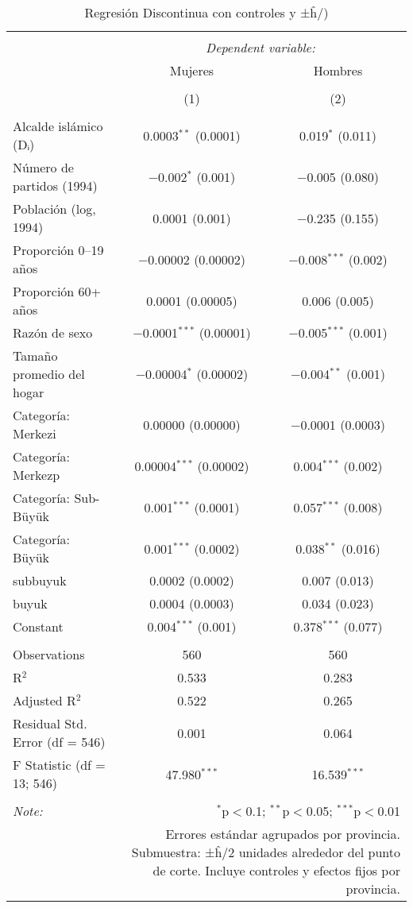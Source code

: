 
\begin{table}[ht!] \centering 
  \caption{Regresión Discontinua con controles y ±ĥ/)} 
  \label{tab:rd_submuestra_h2_mujeres_hombres} 
\begin{tabular}{@{\extracolsep{5pt}}lcc} 
\\[-1.8ex]\hline 
\hline \\[-1.8ex] 
 & \multicolumn{2}{c}{\textit{Dependent variable:}} \\ 
\cline{2-3} 
 & Mujeres & Hombres \\ 
\\[-1.8ex] & (1) & (2)\\ 
\hline \\[-1.8ex] 
 Alcalde islámico (Dᵢ) & 0.0003$^{**}$ (0.0001) & 0.019$^{*}$ (0.011) \\ 
  Número de partidos (1994) & $-$0.002$^{*}$ (0.001) & $-$0.005 (0.080) \\ 
  Población (log, 1994) & 0.0001 (0.001) & $-$0.235 (0.155) \\ 
  Proporción 0–19 años & $-$0.00002 (0.00002) & $-$0.008$^{***}$ (0.002) \\ 
  Proporción 60+ años & 0.0001 (0.00005) & 0.006 (0.005) \\ 
  Razón de sexo & $-$0.0001$^{***}$ (0.00001) & $-$0.005$^{***}$ (0.001) \\ 
  Tamaño promedio del hogar & $-$0.00004$^{*}$ (0.00002) & $-$0.004$^{**}$ (0.001) \\ 
  Categoría: Merkezi & 0.00000 (0.00000) & $-$0.0001 (0.0003) \\ 
  Categoría: Merkezp & 0.00004$^{***}$ (0.00002) & 0.004$^{***}$ (0.002) \\ 
  Categoría: Sub-Büyük & 0.001$^{***}$ (0.0001) & 0.057$^{***}$ (0.008) \\ 
  Categoría: Büyük & 0.001$^{***}$ (0.0002) & 0.038$^{**}$ (0.016) \\ 
  subbuyuk & 0.0002 (0.0002) & 0.007 (0.013) \\ 
  buyuk & 0.0004 (0.0003) & 0.034 (0.023) \\ 
  Constant & 0.004$^{***}$ (0.001) & 0.378$^{***}$ (0.077) \\ 
 \hline \\[-1.8ex] 
Observations & 560 & 560 \\ 
R$^{2}$ & 0.533 & 0.283 \\ 
Adjusted R$^{2}$ & 0.522 & 0.265 \\ 
Residual Std. Error (df = 546) & 0.001 & 0.064 \\ 
F Statistic (df = 13; 546) & 47.980$^{***}$ & 16.539$^{***}$ \\ 
\hline 
\hline \\[-1.8ex] 
\textit{Note:}  & \multicolumn{2}{r}{$^{*}$p$<$0.1; $^{**}$p$<$0.05; $^{***}$p$<$0.01} \\ 
 & \multicolumn{2}{r}{Errores estándar agrupados por provincia. Submuestra: ±ĥ/2 unidades alrededor del punto de corte. Incluye controles y efectos fijos por provincia.} \\ 
\end{tabular} 
\end{table} 

